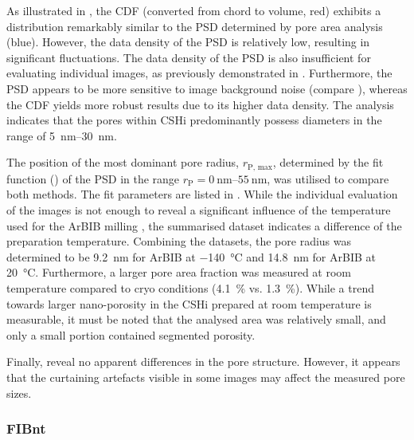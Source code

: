 As illustrated in , the \ac{CDF} (converted from chord to volume, red) exhibits a distribution remarkably similar to the \ac{PSD} determined by pore area analysis (blue).
However, the data density of the \ac{PSD} is relatively low, resulting in significant fluctuations.
The data density of the \ac{PSD} is also insufficient for evaluating individual images, as previously demonstrated in \cite{kleiner.2021a}.
Furthermore, the \ac{PSD} appears to be more sensitive to image background noise (compare ), whereas the \ac{CDF} yields more robust results due to its higher data density.
The analysis indicates that the pores within \ac{CSHi} predominantly possess diameters in the range of \qtyrange{5}{30}{\nano\meter}.

The position of the most dominant pore radius, $r_\text{P, max}$, determined by the fit function () of the \ac{PSD} in the range $r_\text{P}=\qtyrange{0}{55}{\nano\meter}$, was utilised to compare both methods.
The fit parameters are listed in .
While the individual evaluation of the images is not enough to reveal a significant influence of the temperature used for the \ac{ArBIB} milling \cite{kleiner.2021a}, the summarised dataset indicates a difference of the preparation temperature.
Combining the datasets, the pore radius was determined to be \qty{9.2}{\nano\meter} for \ac{ArBIB} at \qty{-140}{\celsius} and \qty{14.8}{\nano\meter} for \ac{ArBIB} at \qty{20}{\celsius}.
Furthermore, a larger pore area fraction was measured at room temperature compared to cryo conditions (\qty{4.1}{\percent} vs. \qty{1.3}{\percent}).
While a trend towards larger nano-porosity in the \ac{CSHi} prepared at room temperature is measurable, it must be noted that the analysed area was relatively small, and only a small portion contained segmented porosity.

Finally,  reveal no apparent differences in the pore structure.
However, it appears that the curtaining artefacts visible in some images may affect the measured pore sizes.



\subsubsection{\acs*{FIBnt}}


